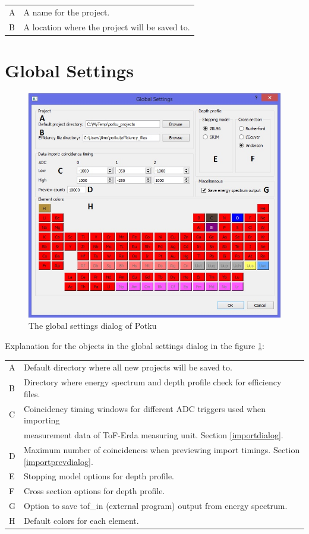 \documentclass{scrreprt}
\begin{document}
\begin{tabular}{ll}
A & A name for the project.\\
B & A location where the project will be saved to.\\
\end{tabular}

\section{Global Settings}\label{globalsettings}
\begin{figure}[H]
\centering
\includegraphics[width=140mm]{globalsettings}
\caption{The global settings dialog of Potku}
\label{fig-globalsettings}
\end{figure}
Explanation for the objects in the global settings dialog in the figure \ref{fig-globalsettings}:

\begin{tabular}{ll}
A & Default directory where all new projects will be saved to.\\
B & Directory where energy spectrum and depth profile check for efficiency files.\\
C & Coincidency timing windows for different ADC triggers used when importing \\&measurement data of ToF-Erda measuring unit. Section \ref{importdialog}.\\
D & Maximum number of coincidences when previewing import timings. Section \ref{importprevdialog}.\\
E & Stopping model options for depth profile.\\
F & Cross section options for depth profile.\\
G & Option to save tof_in (external program) output from energy spectrum.\\
H & Default colors for each element.\\
\end{tabular}
\end{document}
